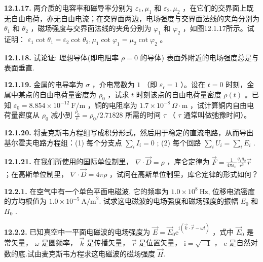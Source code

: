 \vfill
\newpage

\textbf{12.1.17.} 两介质的电容率和磁导率分别为 $\varepsilon_{1},\mu_{1}$ 和 $\varepsilon_{2},\mu_{2}$ ，在它们的交界面上既无自由电荷，亦无自由电流；在交界面两边，电场强度与交界面法线的夹角分别为 $\theta_{1}$ 和 $\theta_{2}$ ，磁场强度与交界面法线的夹角分别为 $\varphi_{1}$ 和 $\varphi_{2}$ ，如图12.1.17所示。试证明： $\varepsilon_{1} \cot \theta_{1} = \varepsilon_{2} \cot \theta_{2}, \mu_{1} \cot \varphi_{1} = \mu_{2} \cot \varphi_{2}$ 。

\begin{center}
\end{center}

\vfill
\newpage

\textbf{12.1.18.} 试论证: 理想导体(即电阻率 $\rho = 0$ 的导体) 表面外附近的电场强度总是与表面垂直.

\vfill
\newpage

\textbf{12.1.19.} 金属的电导率为 $\sigma$ ，介电常数为 $1$ （即 $\varepsilon_{\mathrm{r}} = 1$ ）。设在 $t = 0$ 时刻，金属中某点的自由电荷量密度为 $\rho_0$ ，试求 $t$ 时刻该点的自由电荷量密度 $\rho(t)$ 。已知 $\varepsilon_0 = 8.854 \times 10^{-12} \mathrm{~F/m}$ ，铜的电阻率为 $1.7 \times 10^{-8}~\Omega \cdot \mathrm{m}$ ，试计算铜内自由电荷量密度从 $\rho_0$ 减小到 $\displaystyle \frac{\rho_0}{\mathrm{e}} = \rho_0 / 2.71828$ 所需的时间 $\tau$ （ $\tau$ 通常叫做弛豫时间）。

\vfill
\newpage

\textbf{12.1.20.} 将麦克斯韦方程组写成积分形式，然后用于稳定的直流电路，从而导出基尔霍夫电路方程组：(1) 每个分支点 $\displaystyle \sum_{i} I_{i} = 0$ ; (2) 每个回路 $\displaystyle \sum_{i} U_{i} = \sum_{i} E_{i}$ .

\vfill
\newpage

\textbf{12.1.21.} 在我们所使用的国际单位制里， $\nabla \cdot \vec{D} = \rho$ ，库仑定律为 $\displaystyle \vec{F} = \frac{1}{4\pi\varepsilon_0} \frac{q_1 q_2}{r^3} \vec{r}$ ；在高斯单位制里， $\nabla \cdot \vec{D} = 4\pi\rho$ ，试问在高斯单位制里，库仑定律的形式如何？

\vfill
\newpage

\textbf{12.2.1.} 在空气中有一个单色平面电磁波, 它的频率为 $1.0 \times 10^{8}\mathrm{~Hz}$, 位移电流密度的方均根值为 $1.0 \times 10^{-5}\mathrm{~A/m}^2$. 试求这电磁波的电场强度和磁场强度的振幅 $E_{0}$ 和 $H_{0}$ .

\vfill
\newpage

\textbf{12.2.2.} 已知真空中一平面电磁波的电场强度为 $\vec{E} = \vec{E}_0\mathrm{e}^{\mathrm{i}(\vec{k}\cdot \vec{r} - \omega t)}$ ，式中 $\vec{E}_0$ 是常矢量， $\omega$ 是圆频率， $\vec{k}$ 是传播矢量， $\vec{r}$ 是位置矢量， $\mathrm{i} = \sqrt{-1}$ ， $\mathrm{e}$ 是自然对数的底.试由麦克斯韦方程求这电磁波的磁场强度 $\vec{H}$.

